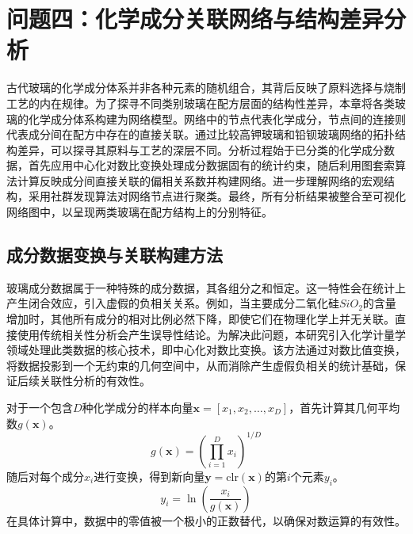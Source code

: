 \section{问题四：化学成分关联网络与结构差异分析}

古代玻璃的化学成分体系并非各种元素的随机组合，其背后反映了原料选择与烧制工艺的内在规律。为了探寻不同类别玻璃在配方层面的结构性差异，本章将各类玻璃的化学成分体系构建为网络模型。网络中的节点代表化学成分，节点间的连接则代表成分间在配方中存在的直接关联。通过比较高钾玻璃和铅钡玻璃网络的拓扑结构差异，可以探寻其原料与工艺的深层不同。分析过程始于已分类的化学成分数据，首先应用中心化对数比变换处理成分数据固有的统计约束，随后利用图套索算法计算反映成分间直接关联的偏相关系数并构建网络。进一步理解网络的宏观结构，采用社群发现算法对网络节点进行聚类。最终，所有分析结果被整合至可视化网络图中，以呈现两类玻璃在配方结构上的分别特征。

\subsection{成分数据变换与关联构建方法}

玻璃成分数据属于一种特殊的成分数据，其各组分之和恒定。这一特性会在统计上产生闭合效应，引入虚假的负相关关系。例如，当主要成分二氧化硅$SiO_2$的含量增加时，其他所有成分的相对比例必然下降，即使它们在物理化学上并无关联。直接使用传统相关性分析会产生误导性结论。为解决此问题，本研究引入化学计量学领域处理此类数据的核心技术，即中心化对数比变换。该方法通过对数比值变换，将数据投影到一个无约束的几何空间中，从而消除产生虚假负相关的统计基础，保证后续关联性分析的有效性。

对于一个包含$D$种化学成分的样本向量$\boldsymbol{x} = [x_1, x_2, \dots, x_D]$，首先计算其几何平均数$g(\boldsymbol{x})$。
\begin{equation}
g(\boldsymbol{x}) = \left( \prod_{i=1}^{D} x_i \right)^{1/D}
\end{equation}
随后对每个成分$x_i$进行变换，得到新向量$\boldsymbol{y} = \text{clr}(\boldsymbol{x})$的第$i$个元素$y_i$。
\begin{equation}
y_i = \ln\left(\frac{x_i}{g(\boldsymbol{x})}\right)
\end{equation}
在具体计算中，数据中的零值被一个极小的正数替代，以确保对数运算的有效性。

